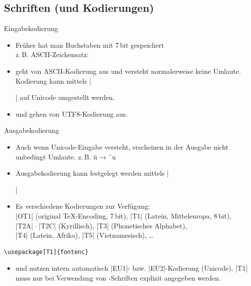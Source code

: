 \documentclass[
	vorläufig=true,
	datum=2016-10-28,
	titel={Allgemeine Formatierung und Pakete},
	web=true,
]{../tex/latexkurs-slides}
\begin{document}
\subsection{Schriften (und Kodierungen)}
\begin{frame}[fragile]{Eingabekodierung}
\begin{itemize}
\item Früher\texttrademark{} hat man Buchstaben mit 7\,bit gespeichert\\
z.\,B. ASCII-Zeichensatz:
\begin{verbatim*}
 !"#$%
@ABCDEFGHIJKLMNOPQRSTUVWXYZ[\]^_
`abcdefghijklmnopqrstuvwxyz{|}~ 
\end{verbatim*}
\item<2->  geht von ASCII-Kodierung aus und versteht normalerweise keine Umlaute.\\
Kodierung kann mittels |\usepackage[utf8]{inputenc}| auf Unicode umgestellt werden.
\item<3-> \XeLaTeX und  gehen von UTF8-Kodierung aus.
\end{itemize}
\end{frame}

\begin{frame}[fragile]{Ausgabekodierung}
\begin{itemize}
\item Auch wenn  Unicode-Eingabe versteht, erscheinen in der Ausgabe nicht unbedingt Umlaute. \hfill z.\,B. ü → ¨u
\item Ausgabekodierung kann festgelegt werden mittels |\usepackage[||]{fontenc}|
\item Es verschiedene Kodierungen zur Verfügung:
\\|OT1| (original \TeX-Encoding, 7\,bit), |T1| (Latein, Mitteleuropa, 8\,bit), |T2A|\,–\,|T2C| (Kyrillisch), |T3| (Phonetisches Alphabet),\\|T4| (Latein, Afrika), |T5| (Vietnamesisch), …
\end{itemize}
\begin{lstlisting}
\usepackage[T1]{fontenc}
\end{lstlisting}
\pause
\begin{itemize}
\item \XeLaTeX und  nutzen intern automatisch |EU1|- bzw. |EU2|-Kodierung (Unicode). |T1| muss  nur bei Verwendung von -Schriften explizit angegeben werden.
\end{itemize}
\end{frame}
\end{document}
